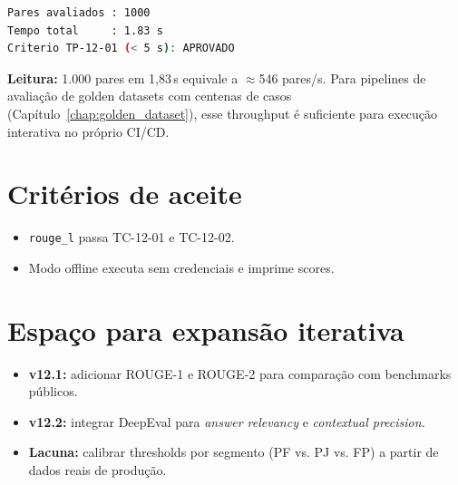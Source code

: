 \begin{lstlisting}[language=bash,
      caption={TP-12-01 --- sa\'ida de throughput do avaliador em batch.},
      label={lst:cap12_tp01_saida}]
Pares avaliados : 1000
Tempo total     : 1.83 s
Criterio TP-12-01 (< 5 s): APROVADO
\end{lstlisting}

\noindent\textbf{Leitura:} 1.000 pares em 1,83\,s equivale a
$\approx$546 pares/s. Para pipelines de avalia\c{c}\~ao de golden
datasets com centenas de casos (Cap\'itulo~\ref{chap:golden_dataset}),
esse throughput \'e suficiente para execu\c{c}\~ao interativa no
pr\'oprio CI/CD.

\section{Crit\'erios de aceite}

\begin{itemize}[leftmargin=*]
  \item \texttt{rouge\_l} passa TC-12-01 e TC-12-02.
  \item Modo offline executa sem credenciais e imprime scores.
\end{itemize}

\section{Espa\c{c}o para expans\~ao iterativa}

\begin{itemize}[leftmargin=*]
  \item \textbf{v12.1:} adicionar ROUGE-1 e ROUGE-2 para
        compara\c{c}\~ao com benchmarks p\'ublicos.
  \item \textbf{v12.2:} integrar DeepEval para \textit{answer
        relevancy} e \textit{contextual precision}.
  \item \textbf{Lacuna:} calibrar thresholds por segmento (PF vs.
        PJ vs. FP) a partir de dados reais de produ\c{c}\~ao.
\end{itemize}
